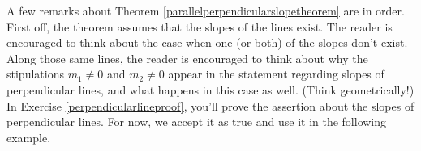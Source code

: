 \documentclass{ximera}
\begin{document}
\begin{center}
\end{center}


A few remarks about Theorem \ref{parallelperpendicularslopetheorem} are in order.  First off, the theorem assumes that the slopes of the lines exist.  The reader is encouraged to think about the case when one (or both) of the slopes don't exist.  Along those same lines, the reader is encouraged to think about why the stipulations $m_1 \neq 0$ and $m_2 \neq 0$ appear in the statement regarding slopes of perpendicular lines, and what happens in this case as well.  (Think geometrically!)   In Exercise \ref{perpendicularlineproof}, you'll prove the assertion about the slopes of perpendicular lines.  For now, we accept it as true and use it in the following example.
\end{document}

